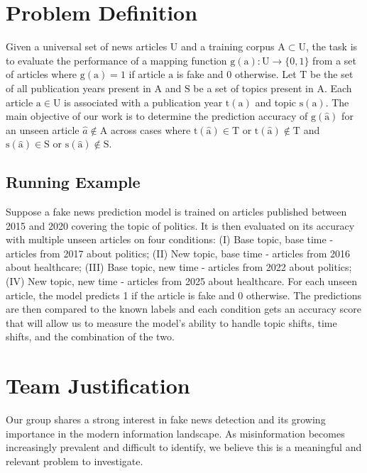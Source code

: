 \documentclass[sigconf]{acmart}
\begin{document}
\section{Problem Definition}
Given a universal set of news articles $\mathrm{U}$ and a training corpus $\mathrm{A\subset U}$, the task is to evaluate the performance of a mapping function $\mathrm{g(a):U \rightarrow \{0,1\}}$ from a set of articles where $\mathrm{g(a)} = 1$ if article $\mathrm{a}$ is fake and $0$ otherwise. Let $\mathrm{T}$ be the set of all publication years present in $\mathrm{A}$ and $\mathrm{S}$ be a set of topics present in $\mathrm{A}$. Each article $\mathrm{a\in U}$ is associated with a publication year $\mathrm{t(a)}$ and topic $\mathrm{s(a)}$. The main objective of our work is to determine the prediction accuracy of $\mathrm{g(\hat{a})}$ for an unseen article $\hat{a}\notin \mathrm{A}$ across cases where $\mathrm{t(\hat{a})\in T}$ or $\mathrm{t(\hat{a})\notin T}$ and $\mathrm{s(\hat{a})\in S}$ or $\mathrm{s(\hat{a})\notin S}$. 

\subsection{Running Example}
Suppose a fake news prediction model is trained on articles published between 2015 and 2020 covering the topic of politics. It is then evaluated on its accuracy with multiple unseen articles on four conditions: (I) Base topic, base time - articles from 2017 about politics; (II) New topic, base time - articles from 2016 about healthcare; (III) Base topic, new time - articles from 2022 about politics; (IV) New topic, new time - articles from 2025 about healthcare. For each unseen article, the model predicts 1 if the article is fake and 0 otherwise. The predictions are then compared to the known labels and each condition gets an accuracy score that will allow us to measure the model’s ability to handle topic shifts, time shifts, and the combination of the two.

\section{Team Justification}
Our group shares a strong interest in fake news detection and its growing importance in the modern information landscape. As misinformation becomes increasingly prevalent and difficult to identify, we believe this is a meaningful and relevant problem to investigate.


 
\vfill
\end{document}
